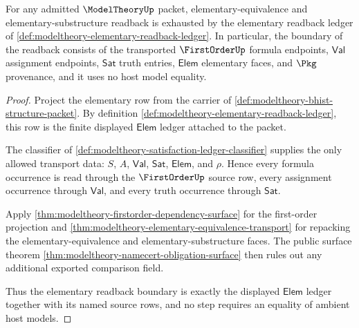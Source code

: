 \begin{theorem}\label{thm:modeltheory-elementary-readback-boundary}
For any admitted $\ModelTheoryUp$ packet, elementary-equivalence and
elementary-substructure readback is exhausted by the elementary readback
ledger of \autoref{def:modeltheory-elementary-readback-ledger}. In
particular, the boundary of the readback consists of the transported
$\FirstOrderUp$ formula endpoints, $\mathsf{Val}$ assignment endpoints,
$\mathsf{Sat}$ truth entries, $\mathsf{Elem}$ elementary faces, and $\Pkg$
provenance, and it uses no host model equality.
\end{theorem}
\begin{proof}
Project the elementary row from the carrier of
\autoref{def:modeltheory-bhist-structure-packet}. By definition
\autoref{def:modeltheory-elementary-readback-ledger}, this row is the finite
displayed $\mathsf{Elem}$ ledger attached to the packet.

The classifier of
\autoref{def:modeltheory-satisfaction-ledger-classifier} supplies the only
allowed transport data: $S$, $A$, $\mathsf{Val}$, $\mathsf{Sat}$,
$\mathsf{Elem}$, and $\rho$. Hence every formula occurrence is read through
the $\FirstOrderUp$ source row, every assignment occurrence through
$\mathsf{Val}$, and every truth occurrence through $\mathsf{Sat}$.

Apply
\autoref{thm:modeltheory-firstorder-dependency-surface} for the first-order
projection and
\autoref{thm:modeltheory-elementary-equivalence-transport} for repacking the
elementary-equivalence and elementary-substructure faces. The public surface
theorem \autoref{thm:modeltheory-namecert-obligation-surface} then rules out
any additional exported comparison field.

Thus the elementary readback boundary is exactly the displayed
$\mathsf{Elem}$ ledger together with its named source rows, and no step
requires an equality of ambient host models.
\end{proof}

